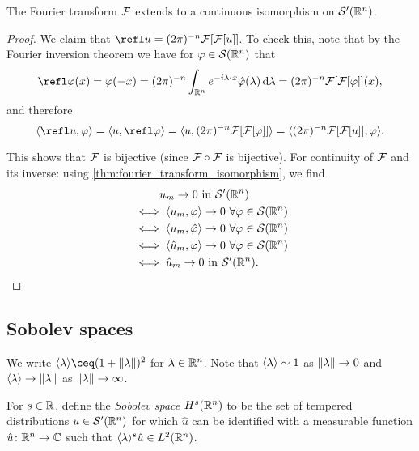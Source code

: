 \begin{theorem}
	The Fourier transform $\mathcal F$ extends to a continuous isomorphism on $\mathcal S'(\mathbb R^n)$. 
\end{theorem}

\begin{proof}
	We claim that $\refl u = (2\pi)^{-n} \FF[\FF[u]]$. To check this, note that by the Fourier inversion theorem we have for $\varphi \in \mathcal S(\mathbb R^n)$ that
	\[
	\refl\phi(x) = \phi(-x) = (2\pi)^{-n} \int_{\RR^n} e^{-i\lambda\vd x} \hat\phi(\lambda) \dd{\lambda} = (2\pi)^{-n} \FF[\FF[\phi]](x),
	\]
	and therefore 
	\[
	\ang{\refl u, \phi} = \ang{u, \refl\phi} = \ang{u, (2\pi)^{-n} \FF[\FF[\phi]]} = \ang{(2\pi)^{-n} \FF[\FF[u]], \phi}. 
	\]
	
	This shows that $\mathcal F$ is bijective (since $\mathcal F\circ \mathcal F$ is bijective). For continuity of $\mathcal F$ and its inverse: using \cref{thm:fourier_transform_isomorphism}, we find
	\begin{align*}
	&\phantom{\iff} u_m \to 0 \text{ in $\mathcal S'(\mathbb R^n)$} \\
	&\iff \langle u_m, \varphi\rangle \to 0 \ \forall \varphi \in \mathcal S(\mathbb R^n) \\
	&\iff \langle u_m, \hat{\varphi}\rangle \to 0 \ \forall \varphi \in \mathcal S(\mathbb R^n) \\
	&\iff \langle\hat u_m, \varphi\rangle \to 0 \ \forall \varphi \in \mathcal S(\mathbb R^n) \\
	&\iff \hat u_m \to 0 \text{ in $\mathcal S'(\mathbb R^n)$}.
	\end{align*}
\end{proof}

\subsection{Sobolev spaces}
\begin{convention}
	We write $\ang{\lambda} \ceq (1 + \norm{\lambda})^2$ for $\lambda \in \mathbb R^n$. Note that $\langle\lambda\rangle \sim 1$ as $\norm{\lambda} \to 0$ and $\langle\lambda\rangle \to \norm{\lambda}$ as $\norm{\lambda} \to \infty$. 
\end{convention}

\begin{definition}
	For $s \in \mathbb R$, define the \emph{Sobolev space} $H^s(\mathbb R^n)$ to be the set of tempered distributions $u \in \mathcal S'(\mathbb R^n)$ for which $\hat u$ can be identified with a measurable function $\hat u \colon \mathbb R^n \to \mathbb C$ such that $\langle\lambda\rangle^s \hat u \in L^2(\mathbb R^n)$. 
\end{definition}


